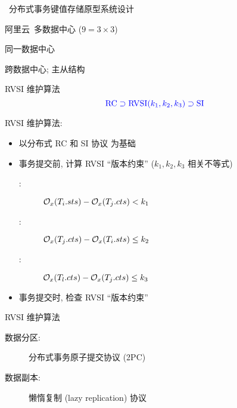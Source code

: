 \begin{frame}{\chameleon{}~\footnotemark[1]分布式事务键值存储原型系统设计}
  \begin{description}
	\item[系统架构:] 阿里云~\footnotemark[2]多数据中心 {\small ($9 = 3 \times 3$)} %
	\item<2->[数据分区:] 同一数据中心
	\item<2->[数据副本:] 跨数据中心; 主从结构
  \end{description}


\end{frame}
\begin{frame}{RVSI 维护算法}
  \[
    \textcolor{blue}{\text{RC} \supset \text{RVSI}(k_1, k_2, k_3) \supset \text{SI}}
  \]

  \vspace{0.10cm}

  RVSI 维护算法:
  \begin{itemize}
    \item 以分布式 RC 和 SI 协议 为基础
	  \pause
    \item 事务提交前, 计算 RVSI ``版本约束'' ($k_1, k_2, k_3$ 相关不等式)
	  \begin{description}
		\item[\konebv{}:] $\mathcal{O}_{x}(T_i.{sts}) - \mathcal{O}_{x}(T_j.{cts}) < k_1$
		\item[\ktwofv{}:] $\mathcal{O}_{x}(T_j.{cts}) - \mathcal{O}_{x}(T_i.{sts}) \le k_2$
		\item[\kthreesv{}:] $\mathcal{O}_{x}(T_l.{cts}) - \mathcal{O}_{x}(T_j.{cts}) \le k_3$
	  \end{description}
    \item 事务提交时, 检查 RVSI ``版本约束''
  \end{itemize}

\end{frame}
\begin{frame}{RVSI 维护算法}
  \begin{description}
	\item[数据分区:] 分布式事务原子提交协议 {\small (2PC)}
	\item[数据副本:] 懒惰复制 {\small (lazy replication)} 协议
  \end{description}

\end{frame}
